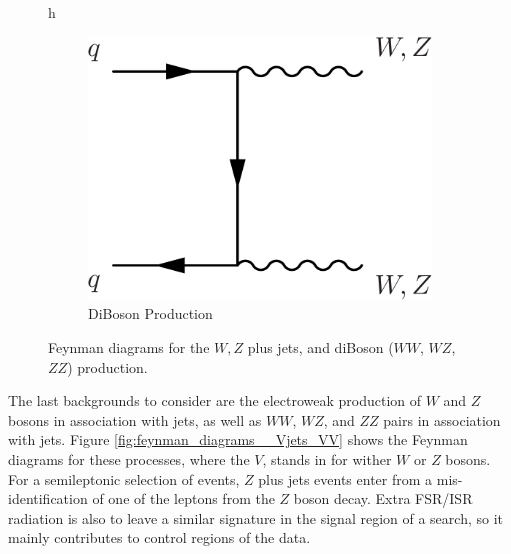 \begin{figure}{h}
\begin{subfigure}[h]{0.3\textwidth}
        \includegraphics[width=\textwidth]{Figures/Feynman_Diagrams/backgrounds__VV.pdf}
        \caption{DiBoson Production}\label{fd:VV}
      \end{subfigure}
      \caption{Feynman diagrams for the $W,Z$ plus jets, and diBoson
        ($WW$, $WZ$, $ZZ$) production.} \label{fig:feynman_diagrams__Vjets__VV}
\end{figure}

\par The last backgrounds to consider are the electroweak production
of $W$ and $Z$ bosons in association with jets, as well as $WW$, $WZ$, and
$ZZ$ pairs in association with jets.  Figure
\ref{fig:feynman_diagrams__Vjets_VV} shows the Feynman diagrams for
these processes, where the $V$, stands in for wither $W$ or $Z$
bosons.  For a semileptonic selection of \ttH events, $Z$ plus jets
events enter from a mis-identification of one of the leptons from the
$Z$ boson decay.  Extra FSR/ISR radiation is also to leave a similar
signature in the signal region of a \ttH search, so it mainly
contributes to control regions of the data.  

